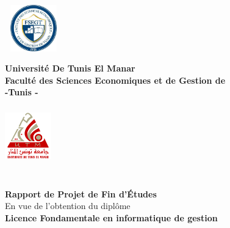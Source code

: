 \begin{titlepage}
\begin{center}
	\begin{minipage}{2.5cm}
	\begin{center}
		\includegraphics[width=2.5cm,height=2cm]{logo-ensak.png}
		
    \end{center}
\end{minipage}\hfill
\begin{minipage}{8cm}
	\begin{center}
	\textbf{ Université De Tunis El Manar}\\[0.1cm]
    \textbf{\uppercase{F}aculté des Sciences Economiques
    	et de Gestion de}\\[0.1cm]
    \textbf{-Tunis -}
\end{center}
\end{minipage}\hfill
\begin{minipage}{2cm}
	\begin{center}
	\includegraphics[width=2cm,height=2.5cm]{uni.png}
	\end{center}

\end{minipage}
\textsc{\Large }\\[1.5cm]
{\large \bfseries Rapport de  Projet de Fin d'\uppercase{é}tudes}\\[0.5cm]
{\large En vue de l'obtention du diplôme}\\[0.5cm]

{\large \bfseries Licence Fondamentale en informatique de gestion}
\textsc{\Large }\\[0.5cm]


\end{center}
\end{titlepage}
